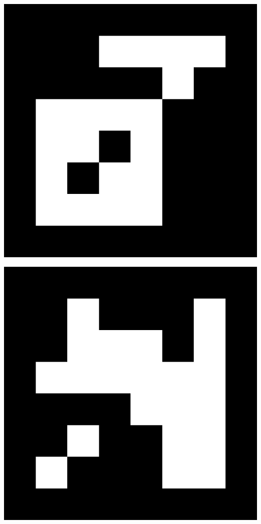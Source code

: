 \newpage
\myemptypage
\vspace{5cm}
\begin{center}
\includegraphics[width=\textwidth, keepaspectratio]{aruco_09.png}
\end{center}
\newpage
\myemptypage
\vspace{5cm}
\begin{center}
\includegraphics[width=\textwidth, keepaspectratio]{aruco_10.png}
\end{center}
